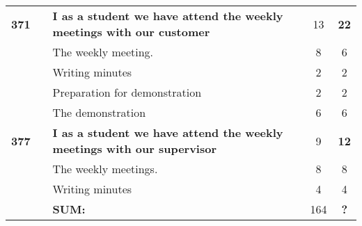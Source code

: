 \begin{longtable}{ccXcc}
\midrule		
\textbf{371} 	& {C1}
	& {\bf I as a student we have attend the weekly meetings with our customer} 	& 	13	& \textbf{22} \\
				&& The weekly meeting.	& 8 & 6 \\
				&& Writing minutes 	&  2 & 2 \\	
				&& Preparation for demonstration	&  2 & 2 \\
				&& The demonstration	&  6 & 6 \\

\textbf{377} 	& {C1}
	& {\bf I as a student we have attend the weekly meetings with our supervisor} 	& 	9	& \textbf{12} \\
				&& The weekly meetings.	& 8 & 8 \\
				&& Writing minutes 	&  4 & 4 \\	
				
\hline
				&& \textbf{SUM:}		&		164	& \textbf{?}\\																			
\bottomrule[1mm]
\end{longtable}